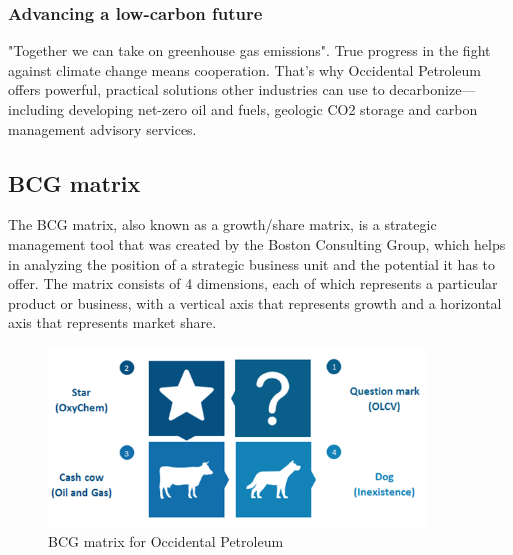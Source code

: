 \documentclass[
	a4paper, %
	12pt,%
]{CSSullivanBusinessReport}
\begin{document}
\begin{fullwidth}
\subsubsection{Advancing a low-carbon future}
"Together we can take on greenhouse gas emissions". True progress in the fight against climate change means cooperation. That’s why Occidental Petroleum offers powerful, practical solutions other industries can use to decarbonize—including developing net-zero oil and fuels, geologic CO2 storage and carbon management advisory services.

\subsection{BCG matrix}
The BCG matrix, also known as a growth/share matrix, is a strategic management tool that was created by the Boston Consulting Group, which helps in analyzing the position of a strategic business unit and the potential it has to offer. The matrix consists of 4 dimensions, each of which represents a particular product or business, with a vertical axis that represents growth and a horizontal axis that represents market share.
\begin{figure}[H]
    \centering
    \includegraphics[width = 10cm]{Images/BCG matrix yjy.png}
    \caption{BCG matrix for Occidental Petroleum}
    \label{BCG_matrix}
\end{figure}

\end{fullwidth}
\end{document}
